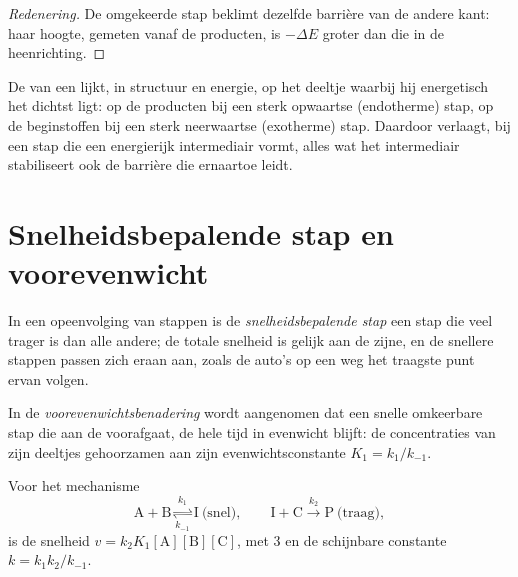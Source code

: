 \begin{proof}[Redenering]
De omgekeerde stap beklimt dezelfde barrière van de andere kant: haar
hoogte, gemeten vanaf de producten, is $-\Delta E$ groter dan die in de
heenrichting.
\end{proof}

\begin{proposition}\label{prop:b1:elementary-steps:hammond}
De  van een  lijkt, in structuur en
energie, op het deeltje waarbij hij energetisch het dichtst ligt: op de
producten bij een sterk opwaartse (endotherme) stap, op de beginstoffen
bij een sterk neerwaartse (exotherme) stap. Daardoor verlaagt, bij een
stap die een energierijk intermediair vormt, alles wat het intermediair
stabiliseert ook de barrière die ernaartoe leidt.
\end{proposition}
\admitted

\section{Snelheidsbepalende stap en voorevenwicht}

\begin{definition}\label{def:b1:elementary-steps:rds}
In een opeenvolging van stappen is de \emph{snelheidsbepalende
stap} een stap die veel trager is dan alle
andere; de totale snelheid is gelijk aan de zijne, en de snellere stappen
passen zich eraan aan, zoals de auto's op een weg het traagste punt ervan
volgen.
\end{definition}

\begin{definition}[Voorevenwichtsbenadering]\label{def:b1:elementary-steps:pre-equilibrium}
In de \emph{voorevenwichtsbenadering}
wordt aangenomen dat een snelle omkeerbare stap die aan de
 voorafgaat, de hele tijd in evenwicht blijft: de
concentraties van zijn deeltjes gehoorzamen aan zijn evenwichtsconstante
$K_1 = k_1/k_{-1}$.
\end{definition}

\begin{proposition}\label{prop:b1:elementary-steps:pre-equilibrium-law}
Voor het mechanisme
\[
  \mathrm{A} + \mathrm{B} \underset{k_{-1}}{\overset{k_1}{\rightleftharpoons}} \mathrm{I}
  \ \text{(snel)}, \qquad
  \mathrm{I} + \mathrm{C} \xrightarrow{\ k_2\ } \mathrm{P} \ \text{(traag)},
\]
is de snelheid $v = k_2K_1[\mathrm{A}][\mathrm{B}][\mathrm{C}]$, met
 3 en de schijnbare constante $k = k_1k_2/k_{-1}$.
\end{proposition}

